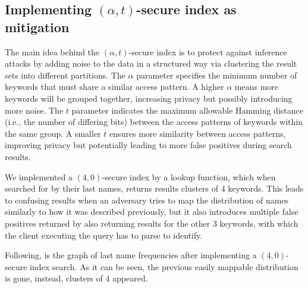 \subsection{Implementing $(\alpha, t)$-secure index as mitigation}

The main idea behind the $(\alpha,t)$-secure index is to protect against inference attacks by adding noise to the data in a structured way via clustering the result sets into different partitions. The $\alpha$ parameter specifies the minimum number of keywords that must share a similar access pattern. A higher $\alpha$ means more keywords will be grouped together, increasing privacy but possibly introducing more noise. The $t$ parameter indicates the maximum allowable Hamming distance (i.e., the number of differing bits) between the access patterns of keywords within the same group. A smaller $t$ ensures more similarity between access patterns, improving privacy but potentially leading to more false positives during search results.

We implemented a $(4,0)$-secure index by a lookup function, which when searched for by their last names, returns results clusters of 4 keywords. This leads to confusing results when an adversary tries to map the distribution of names similarly to how it was described previously, but it also introduces multiple false positives returned by also returning results for the other 3 keywords, with which the client executing the query has to parse to identify.

Following, is the graph of last name frequencies after implementing a $(4, 0)$-secure index search. As it can be seen, the previous easily mappable distribution is gone, instead, clusters of 4 appeared.


